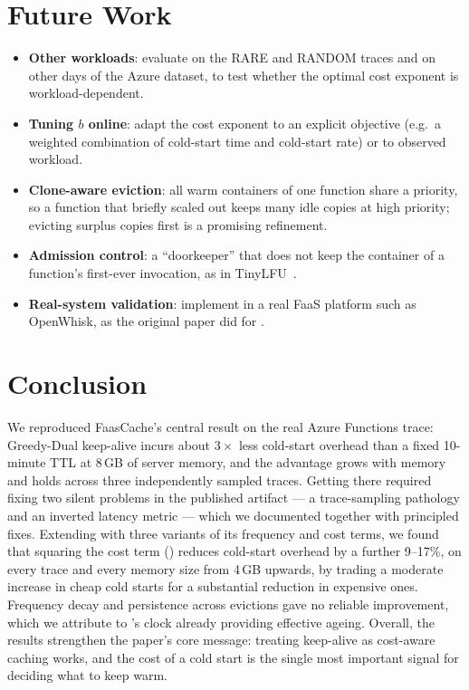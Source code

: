 \documentclass[11pt,a4paper]{article}
\newcommand{\gd}{\text{GD}}
\newcommand{\gdw}{\text{GD-W}}
\begin{document}
\section{Future Work}
\label{sec:future}
\begin{itemize}
  \item \textbf{Other workloads}: evaluate \gdw{} on the RARE and RANDOM traces and on other
        days of the Azure dataset, to test whether the optimal cost exponent is workload-dependent.
  \item \textbf{Tuning $b$ online}: adapt the cost exponent to an explicit objective (e.g.\ a
        weighted combination of cold-start time and cold-start rate) or to observed workload.
  \item \textbf{Clone-aware eviction}: all warm containers of one function share a priority, so
        a function that briefly scaled out keeps many idle copies at high priority; evicting
        surplus copies first is a promising refinement.
  \item \textbf{Admission control}: a ``doorkeeper'' that does not keep the container of a
        function's first-ever invocation, as in TinyLFU~\cite{einziger2017tinylfu}.
  \item \textbf{Real-system validation}: implement \gdw{} in a real FaaS platform such as OpenWhisk,
        as the original paper did for \gd{}.
\end{itemize}

\section{Conclusion}
\label{sec:conclusion}
We reproduced FaasCache's central result on the real Azure Functions trace: Greedy-Dual
keep-alive incurs about $3\times$ less cold-start overhead than a fixed 10-minute TTL at 8\,GB
of server memory, and the advantage grows with memory and holds across three independently
sampled traces. Getting there required fixing two silent problems in the published artifact
--- a trace-sampling pathology and an inverted latency metric --- which we documented together
with principled fixes. Extending \gd{} with three variants of its frequency and cost terms,
we found that squaring the cost term (\gdw{}) reduces cold-start overhead by a further 9--17\%,
on every trace and every memory size from 4\,GB upwards, by trading a moderate increase in cheap
cold starts for a substantial reduction in expensive ones. Frequency decay and persistence across
evictions gave no reliable improvement, which we attribute to \gd{}'s clock already providing
effective ageing. Overall, the results strengthen the paper's core message: treating keep-alive as
cost-aware caching works, and the cost of a cold start is the single most important signal for
deciding what to keep warm.
\end{document}
